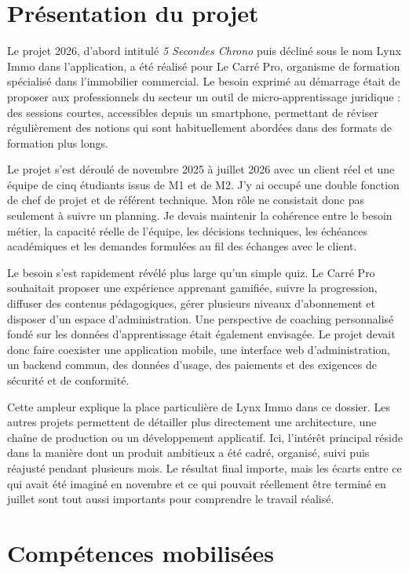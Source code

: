 \section{Présentation du projet}

Le projet  2026, d'abord intitulé \textit{5 Secondes Chrono} puis décliné sous le nom Lynx Immo dans l'application, a été réalisé pour Le Carré Pro, organisme de formation spécialisé dans l'immobilier commercial. Le besoin exprimé au démarrage était de proposer aux professionnels du secteur un outil de micro-apprentissage juridique : des sessions courtes, accessibles depuis un smartphone, permettant de réviser régulièrement des notions qui sont habituellement abordées dans des formats de formation plus longs.

Le projet s'est déroulé de novembre 2025 à juillet 2026 avec un client réel et une équipe de cinq étudiants issus de M1 et de M2. J'y ai occupé une double fonction de chef de projet et de référent technique. Mon rôle ne consistait donc pas seulement à suivre un planning. Je devais maintenir la cohérence entre le besoin métier, la capacité réelle de l'équipe, les décisions techniques, les échéances académiques et les demandes formulées au fil des échanges avec le client.

Le besoin s'est rapidement révélé plus large qu'un simple quiz. Le Carré Pro souhaitait proposer une expérience apprenant gamifiée, suivre la progression, diffuser des contenus pédagogiques, gérer plusieurs niveaux d'abonnement et disposer d'un espace d'administration. Une perspective de coaching personnalisé fondé sur les données d'apprentissage était également envisagée. Le projet devait donc faire coexister une application mobile, une interface web d'administration, un backend commun, des données d'usage, des paiements et des exigences de sécurité et de conformité.

Cette ampleur explique la place particulière de Lynx Immo dans ce dossier. Les autres projets permettent de détailler plus directement une architecture, une chaîne de production ou un développement applicatif. Ici, l'intérêt principal réside dans la manière dont un produit ambitieux a été cadré, organisé, suivi puis réajusté pendant plusieurs mois. Le résultat final importe, mais les écarts entre ce qui avait été imaginé en novembre et ce qui pouvait réellement être terminé en juillet sont tout aussi importants pour comprendre le travail réalisé.

\section{Compétences mobilisées}

